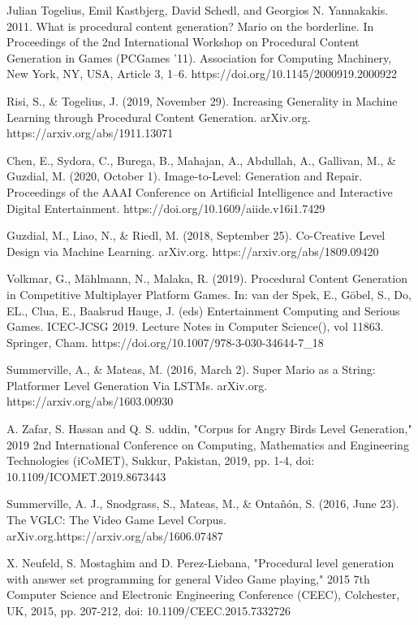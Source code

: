 \documentclass[runningheads]{llncs}
\begin{document}
\begin{thebibliography}{8}
Julian Togelius, Emil Kastbjerg, David Schedl, and Georgios N. Yannakakis. 2011. What is procedural content generation? Mario on the borderline. In Proceedings of the 2nd International Workshop on Procedural Content Generation in Games (PCGames '11). Association for Computing Machinery, New York, NY, USA, Article 3, 1–6. https://doi.org/10.1145/2000919.2000922

Risi, S., \& Togelius, J. (2019, November 29). Increasing Generality in Machine Learning through Procedural Content Generation. arXiv.org. https://arxiv.org/abs/1911.13071

Chen, E., Sydora, C., Burega, B., Mahajan, A., Abdullah, A., Gallivan, M., \& Guzdial, M. (2020, October 1). Image-to-Level: Generation and Repair. Proceedings of the AAAI Conference on Artificial Intelligence and Interactive Digital Entertainment. https://doi.org/10.1609/aiide.v16i1.7429

Guzdial, M., Liao, N., \& Riedl, M. (2018, September 25). Co-Creative Level Design via Machine Learning. arXiv.org. https://arxiv.org/abs/1809.09420

Volkmar, G., Mählmann, N., Malaka, R. (2019). Procedural Content Generation in Competitive Multiplayer Platform Games. In: van der Spek, E., Göbel, S., Do, EL., Clua, E., Baalsrud Hauge, J. (eds) Entertainment Computing and Serious Games. ICEC-JCSG 2019. Lecture Notes in Computer Science(), vol 11863. Springer, Cham. https://doi.org/10.1007/978-3-030-34644-7\_18

Summerville, A., \& Mateas, M. (2016, March 2). Super Mario as a String: Platformer Level Generation Via LSTMs. arXiv.org. https://arxiv.org/abs/1603.00930

A. Zafar, S. Hassan and Q. S. uddin, "Corpus for Angry Birds Level Generation," 2019 2nd International Conference on Computing, Mathematics and Engineering Technologies (iCoMET), Sukkur, Pakistan, 2019, pp. 1-4, doi: 10.1109/ICOMET.2019.8673443

Summerville, A. J., Snodgrass, S., Mateas, M., \& Ontañón, S. (2016, June 23). The VGLC: The Video Game Level Corpus. arXiv.org.https://arxiv.org/abs/1606.07487

X. Neufeld, S. Mostaghim and D. Perez-Liebana, "Procedural level generation with answer set programming for general Video Game playing," 2015 7th Computer Science and Electronic Engineering Conference (CEEC), Colchester, UK, 2015, pp. 207-212, doi: 10.1109/CEEC.2015.7332726


\end{thebibliography}
\end{document}
